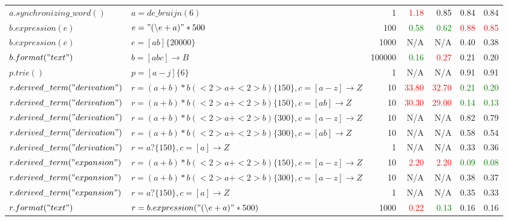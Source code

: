 \begin{tabular}{llr *{4}{r}}
$a.synchronizing\_word()$ & $a = de\_bruijn(6)$ & 1 & \textcolor{red}{\num{ 1.18}} & \num{ 0.85} & \num{ 0.84} & \num{ 0.84} \\
$b.expression(e)$ & $e = "(\backslash e+a)" * 500$ & 100 & \textcolor{green}{\num{ 0.58}} & \textcolor{green}{\num{ 0.62}} & \textcolor{red}{\num{ 0.88}} & \textcolor{red}{\num{ 0.85}} \\
$b.expression(e)$ & $e = [ab]\{20000\}$ & 1000 &   N/A &   N/A & \num{ 0.40} & \num{ 0.38} \\
$b.format("text")$ & $b = [abc] \rightarrow B$ & 100000 & \textcolor{green}{\num{ 0.16}} & \textcolor{red}{\num{ 0.27}} & \num{ 0.21} & \num{ 0.20} \\
$p.trie()$ & $p = [a-j]\{6\}$ & 1 &   N/A &   N/A & \num{ 0.91} & \num{ 0.91} \\
$r.derived\_term("derivation")$ & $r = (a+b)*b(<2>a+<2>b)\{150\}, c = [a-z] \rightarrow Z$ & 10 & \textcolor{red}{\num{33.80}} & \textcolor{red}{\num{32.70}} & \textcolor{green}{\num{ 0.21}} & \textcolor{green}{\num{ 0.20}} \\
$r.derived\_term("derivation")$ & $r = (a+b)*b(<2>a+<2>b)\{150\}, c = [ab] \rightarrow Z$ & 10 & \textcolor{red}{\num{30.30}} & \textcolor{red}{\num{29.00}} & \textcolor{green}{\num{ 0.14}} & \textcolor{green}{\num{ 0.13}} \\
$r.derived\_term("derivation")$ & $r = (a+b)*b(<2>a+<2>b)\{300\}, c = [a-z] \rightarrow Z$ & 10 &   N/A &   N/A & \num{ 0.82} & \num{ 0.79} \\
$r.derived\_term("derivation")$ & $r = (a+b)*b(<2>a+<2>b)\{300\}, c = [ab] \rightarrow Z$ & 10 &   N/A &   N/A & \num{ 0.58} & \num{ 0.54} \\
$r.derived\_term("derivation")$ & $r = a?\{150\}, c = [a] \rightarrow Z$ & 1 &   N/A &   N/A & \num{ 0.33} & \num{ 0.36} \\
$r.derived\_term("expansion")$ & $r = (a+b)*b(<2>a+<2>b)\{150\}, c = [a-z] \rightarrow Z$ & 10 & \textcolor{red}{\num{ 2.20}} & \textcolor{red}{\num{ 2.20}} & \textcolor{green}{\num{ 0.09}} & \textcolor{green}{\num{ 0.08}} \\
$r.derived\_term("expansion")$ & $r = (a+b)*b(<2>a+<2>b)\{300\}, c = [a-z] \rightarrow Z$ & 10 &   N/A &   N/A & \num{ 0.38} & \num{ 0.37} \\
$r.derived\_term("expansion")$ & $r = a?\{150\}, c = [a] \rightarrow Z$ & 1 &   N/A &   N/A & \num{ 0.35} & \num{ 0.33} \\
$r.format("text")$ & $r = b.expression("(\backslash e+a)" * 500)$ & 1000 & \textcolor{red}{\num{ 0.22}} & \textcolor{green}{\num{ 0.13}} & \num{ 0.16} & \num{ 0.16} \\

\end{tabular}
